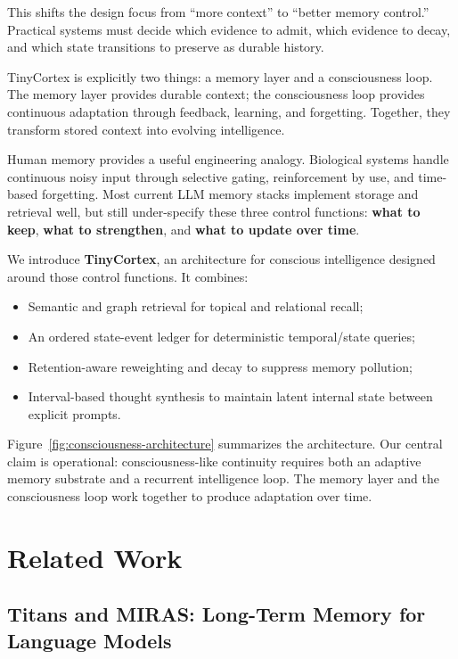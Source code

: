 \documentclass{article}
\begin{document}
This shifts the design focus from ``more context'' to ``better memory
control.'' Practical systems must decide which evidence to admit, which
evidence to decay, and which state transitions to preserve as durable
history.

TinyCortex is explicitly two things: a memory layer and a consciousness loop.
The memory layer provides durable context; the consciousness loop provides
continuous adaptation through feedback, learning, and forgetting. Together,
they transform stored context into evolving intelligence.

Human memory provides a useful engineering analogy. Biological systems handle
continuous noisy input through selective gating, reinforcement by use, and
time-based forgetting. Most current LLM memory stacks implement storage and
retrieval well, but still under-specify these three control functions:
\textbf{what to keep}, \textbf{what to strengthen}, and
\textbf{what to update over time}.

We introduce \textbf{TinyCortex}, an architecture for conscious
intelligence designed around those control functions. It combines:
\begin{itemize}
\item Semantic and graph retrieval for topical and relational recall;
\item An ordered state-event ledger for deterministic temporal/state queries;
\item Retention-aware reweighting and decay to suppress memory pollution;
\item Interval-based thought synthesis to maintain latent internal state
between explicit prompts.
\end{itemize}

Figure~\ref{fig:consciousness-architecture} summarizes the architecture.
Our central claim is operational: consciousness-like continuity requires both
an adaptive memory substrate and a recurrent intelligence loop. The memory
layer and the consciousness loop work together to produce adaptation over time.

\section{Related Work}

\subsection{Titans and MIRAS: Long-Term Memory for Language Models}
\end{document}
